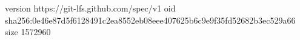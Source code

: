 version https://git-lfs.github.com/spec/v1
oid sha256:0e46e87d5f6128491c2ea8552eb08eee407625b6c9e9f35fd52682b3ec529a66
size 1572960
